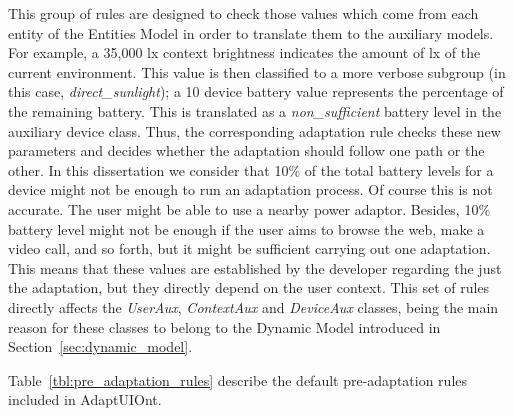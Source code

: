 This group of rules are designed to check those values which come from each entity 
of the Entities Model in order to translate them to the auxiliary models. For 
example, a 35,000 \ac{lx} context brightness indicates the amount of \ac{lx} of the 
current environment. This value is then classified to a more verbose subgroup 
(in this case, \textit{direct\_sunlight}); a 10 device battery value represents 
the percentage of the remaining battery. This is translated as a 
\textit{non\_sufficient} battery level in the auxiliary device class. Thus, the
corresponding adaptation rule checks these new parameters and decides whether the
adaptation should follow one path or the other. In this dissertation we consider
that 10\% of the total battery levels for a device might not be enough to run an
adaptation process. Of course this is not accurate. The user might be able to
use a nearby power adaptor. Besides, 10\% battery level might not be enough if
the user aims to browse the web, make a video call, and so forth, but it might be
sufficient carrying out one adaptation. This means that these values are established
by the developer regarding the just the adaptation, but they directly depend on
the user context. This set of rules directly affects the \textit{UserAux},
\textit{ContextAux} and \textit{DeviceAux} classes, being the main reason for
these classes to belong to the Dynamic Model introduced in Section~\ref{sec:dynamic_model}.

Table~\ref{tbl:pre_adaptation_rules} describe the default pre-adaptation rules
included in AdaptUIOnt.

